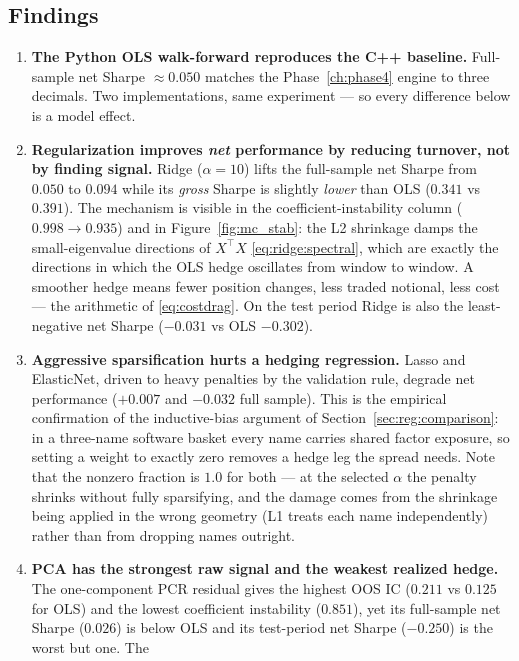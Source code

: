 \subsection{Findings}

\begin{enumerate}[label=\textbf{M\arabic*.}]
  \item \textbf{The Python OLS walk-forward reproduces the C++ baseline.} Full-sample net
    Sharpe $\approx0.050$ matches the Phase~\ref{ch:phase4} engine to three decimals.
    Two implementations, same experiment --- so every difference below is a model effect.
  \item \textbf{Regularization improves \emph{net} performance by reducing turnover, not
    by finding signal.} Ridge ($\alpha{=}10$) lifts the full-sample net Sharpe from
    $0.050$ to $0.094$ while its \emph{gross} Sharpe is slightly \emph{lower} than OLS
    ($0.341$ vs $0.391$). The mechanism is visible in the coefficient-instability column
    ($0.998\to0.935$) and in Figure~\ref{fig:mc_stab}: the L2 shrinkage damps the
    small-eigenvalue directions of $X^{\top}X$ \eqref{eq:ridge:spectral}, which are
    exactly the directions in which the OLS hedge oscillates from window to window. A
    smoother hedge means fewer position changes, less traded notional, less cost --- the
    arithmetic of \eqref{eq:costdrag}. On the test period Ridge is also the
    least-negative net Sharpe ($-0.031$ vs OLS $-0.302$).
  \item \textbf{Aggressive sparsification hurts a hedging regression.} Lasso and
    ElasticNet, driven to heavy penalties by the validation rule, degrade net performance
    ($+0.007$ and $-0.032$ full sample). This is the empirical confirmation of the
    inductive-bias argument of Section~\ref{sec:reg:comparison}: in a three-name
    software basket every name carries shared factor exposure, so setting a weight to
    exactly zero removes a hedge leg the spread needs. Note that the nonzero fraction is
    $1.0$ for both --- at the selected $\alpha$ the penalty shrinks without fully
    sparsifying, and the damage comes from the shrinkage being applied in the wrong
    geometry (L1 treats each name independently) rather than from dropping names outright.
  \item \textbf{PCA has the strongest raw signal and the weakest realized hedge.} The
    one-component PCR residual gives the highest OOS IC ($0.211$ vs $0.125$ for OLS) and
    the lowest coefficient instability ($0.851$), yet its full-sample net Sharpe ($0.026$)
    is below OLS and its test-period net Sharpe ($-0.250$) is the worst but one. The

\end{enumerate}
